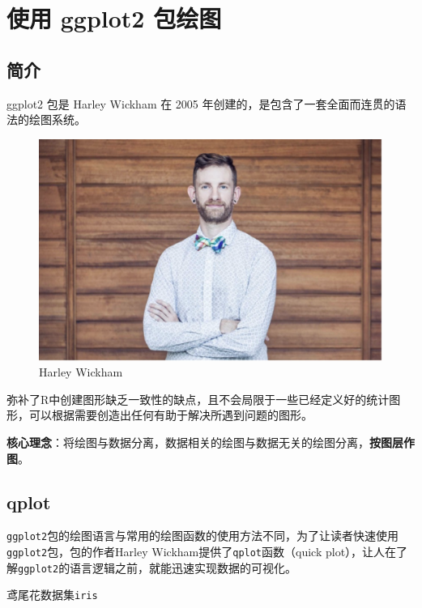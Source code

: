 \documentclass[
]{book}
\begin{document}
\hypertarget{ggplot2-plot}{%
\chapter{使用 ggplot2 包绘图}\label{ggplot2-plot}}

\hypertarget{ux7b80ux4ecb-1}{%
\section{简介}\label{ux7b80ux4ecb-1}}

ggplot2 包是 Harley Wickham 在 2005
年创建的，是包含了一套全面而连贯的语法的绘图系统。

\begin{figure}
\centering
\includegraphics{figure/15.png}
\caption{Harley Wickham}
\end{figure}

弥补了R中创建图形缺乏一致性的缺点，且不会局限于一些已经定义好的统计图形，可以根据需要创造出任何有助于解决所遇到问题的图形。

\textbf{核心理念}：将绘图与数据分离，数据相关的绘图与数据无关的绘图分离，\textbf{按图层作图}。

\hypertarget{qplot}{%
\section{qplot}\label{qplot}}

\texttt{ggplot2}包的绘图语言与常用的绘图函数的使用方法不同，为了让读者快速使用\texttt{ggplot2}包，包的作者Harley
Wickham提供了\texttt{qplot}函数（quick
plot），让人在了解\texttt{ggplot2}的语言逻辑之前，就能迅速实现数据的可视化。

鸢尾花数据集\texttt{iris}
\end{document}
